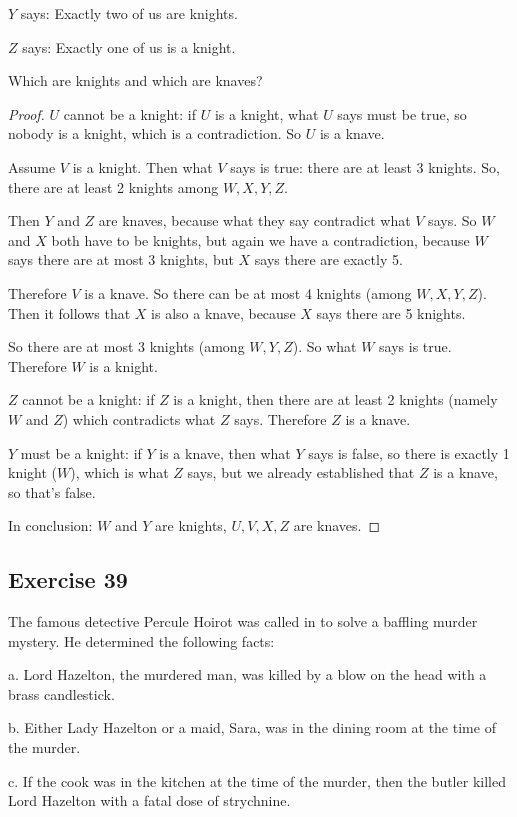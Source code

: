 \documentclass[14pt]{extarticle}
\begin{document}
$Y$ says: Exactly two of us are knights.

$Z$ says: Exactly one of us is a knight.

Which are knights and which are knaves?

\begin{proof}
$U$ cannot be a knight: if $U$ is a knight, what $U$ says must be true, so
nobody is a knight, which is a contradiction. So $U$ is a knave.

Assume $V$ is a knight. Then what $V$ says is true: there are at least 3
knights. So, there are at least 2 knights among $W, X, Y, Z$.

Then $Y$ and $Z$ are knaves, because what they say contradict what $V$ says. So
$W$ and $X$ both have to be knights, but again we have a contradiction, because
$W$ says there are at most 3 knights, but $X$ says there are exactly 5.

Therefore $V$ is a knave. So there can be at most 4 knights (among $W, X, Y,
Z$). Then it follows that $X$ is also a knave, because $X$ says there are 5
knights.

So there are at most 3 knights (among $W, Y, Z$). So what $W$ says is true.
Therefore $W$ is a knight.

$Z$ cannot be a knight: if $Z$ is a knight, then there are at least 2 knights
(namely $W$ and $Z$) which contradicts what $Z$ says. Therefore $Z$ is a knave.

$Y$ must be a knight: if $Y$ is a knave, then what $Y$ says is false, so there
is exactly 1 knight ($W$), which is what $Z$ says, but we already established
that $Z$ is a knave, so that's false.

In conclusion: $W$ and $Y$ are knights, $U,V,X,Z$ are knaves.
\end{proof}

\subsection{Exercise 39}
The famous detective Percule Hoirot was called in to solve a baffling murder
mystery. He determined the following facts:

a. Lord Hazelton, the murdered man, was killed by a blow on the head with a
brass candlestick.

b. Either Lady Hazelton or a maid, Sara, was in the dining room at the time of
the murder.

c. If the cook was in the kitchen at the time of the murder, then the butler
killed Lord Hazelton with a fatal dose of strychnine.
\end{document}
